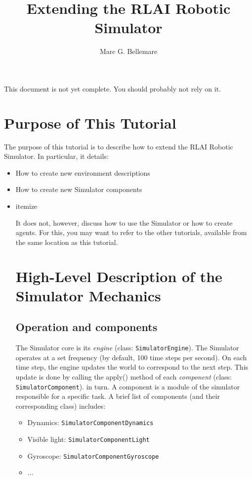 \documentclass[12pt]{article}
\author{Marc G. Bellemare}
\title{Extending the RLAI Robotic Simulator}
\newcommand{\code}[1]{\texttt{#1}}
\newcommand{\keyword}[1]{\textit{#1}}
\begin{document}
\maketitle

This document is not yet complete. You should probably not rely on it.

\section{Purpose of This Tutorial}

The purpose of this tutorial is to describe how to extend the RLAI Robotic
Simulator. In particular, it details:

\begin{itemize}
\item{How to create new environment descriptions}
\item{How to create new Simulator components}
\item{itemize}

It does not, however, discuss how to use the Simulator or how to create agents.
For this, you may want to refer to the other tutorials, available from the
same location as this tutorial.


\section{High-Level Description of the Simulator Mechanics}

\subsection{Operation and components}

The Simulator core is its \keyword{engine} (class: \code{SimulatorEngine}). 
The Simulator operates at a set 
frequency (by default, 100 time steps per second). On each time step, the
engine updates the world to correspond to the next step. This update is done
by calling the apply() method of each \keyword{component} 
(class: \code{SimulatorComponent}). in turn. A component 
is a module of the simulator responsible for a specific task. A brief list
of components (and their corresponding class) includes:

\begin{itemize}
  \item{Dynamics: \code{SimulatorComponentDynamics}}
  \item{Visible light: \code{SimulatorComponentLight}}
  \item{Gyroscope: \code{SimulatorComponentGyroscope}}
  \item{...}
\end{itemize}


\end{itemize}
\end{document}

